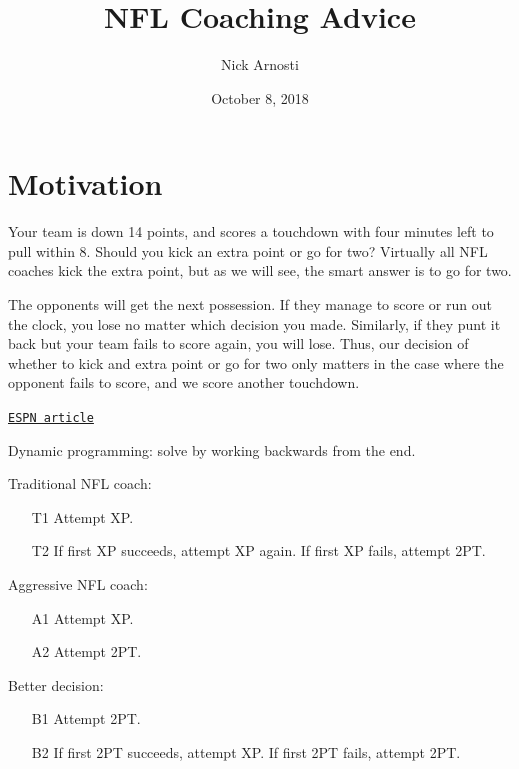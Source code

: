 \documentclass[11pt, oneside]{article}   	%
\title{\vspace{-.3 in} NFL Coaching Advice}
\author{Nick Arnosti}
\date{October 8, 2018}							%
\newcommand{\link}[2]{{ \color{blue} \tt{\href{#1}{#2}}}}
\begin{document}
\maketitle


\section{Motivation}

Your team is down 14 points, and scores a touchdown with four minutes left to pull within 8. Should you kick an extra point or go for two? Virtually all NFL coaches kick the extra point, but as we will see, the smart answer is to go for two.

The opponents will get the next possession. If they manage to score or run out the clock, you lose no matter which decision you made. Similarly, if they punt it back but your team fails to score again, you will lose. Thus, our decision of whether to kick and extra point or go for two only matters in the case where the opponent fails to score, and we score another touchdown.

\link{http://www.espn.com/blog/nflnation/post/_/id/283846/doug-pederson-does-it-again-why-two-point-decision-was-easy-call}{ESPN article}


Dynamic programming: solve by working backwards from the end. 

Traditional NFL coach:
\begin{enumerate}
\item[T1] Attempt XP. 
\item[T2] If first XP succeeds, attempt XP again. If first XP fails, attempt 2PT.
\end{enumerate}

Aggressive NFL coach:
\begin{enumerate}
\item[A1] Attempt XP. 
\item[A2] Attempt 2PT.
\end{enumerate}

Better decision:
\begin{enumerate}
\item[B1] Attempt 2PT. 
\item[B2] If first 2PT succeeds, attempt XP. If first 2PT fails, attempt 2PT.
\end{enumerate}
\end{document}
